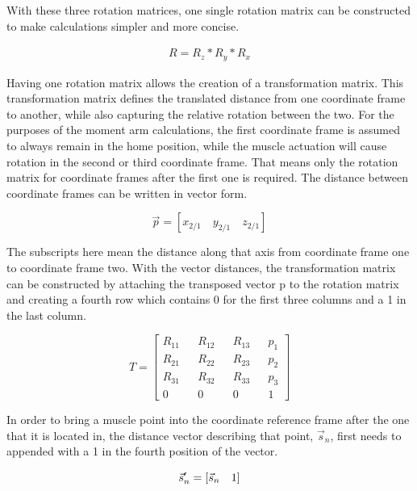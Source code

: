 \documentclass[runningheads]{llncs}
\begin{document}
With these three rotation matrices, one single rotation matrix can be constructed to make calculations simpler and more concise. 

\begin{align}
    R = R_z * R_y * R_x
\end{align}

Having one rotation matrix allows the creation of a transformation matrix. This transformation matrix defines the translated distance from one coordinate frame to another, while also capturing the relative rotation between the two. For the purposes of the moment arm calculations, the first coordinate frame is assumed to always remain in the home position, while the muscle actuation will cause rotation in the second or third coordinate frame. That means only the rotation matrix for coordinate frames after the first one is required. The distance between coordinate frames can be written in vector form.

\begin{equation}
    \Vec{p} = [x_{2/1} \quad  y_{2/1}  \quad z_{2/1}]
\end{equation}

The subscripts here mean the distance along that axis from coordinate frame one to coordinate frame two. With the vector distances, the transformation matrix can be constructed by attaching the transposed vector p to the rotation matrix and creating a fourth row which contains 0 for the first three columns and a 1 in the last column.

\begin{equation}
    T = \begin{bmatrix}
            R_{11} && R_{12} && R_{13} && p_1\\
            R_{21} && R_{22} && R_{23} && p_2\\
            R_{31} && R_{32} && R_{33} && p_3\\
            0 && 0 && 0 && 1
        \end{bmatrix}
\end{equation}

In order to bring a muscle point into the coordinate reference frame after the one that it is located in, the distance vector describing that point, $\vec{s}_n$, first needs to appended with a 1 in the fourth position of the vector.

\begin{equation}
    \Vec{s}_n^{\prime} = [\Vec{s}_n \quad 1]\\
\end{equation}
\end{document}
